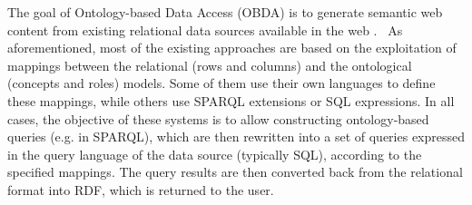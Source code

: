 The goal of Ontology-based Data Access (OBDA) is to generate semantic web content from existing relational data sources available in the web \cite{Sahoo_09}.\
%
As aforementioned, most of the existing approaches are based on the exploitation of mappings between the relational
(rows and columns) and the ontological (concepts and roles) models. Some of them use their own languages to define
these mappings, while others use SPARQL extensions or SQL expressions.
In all cases, the objective of these systems is to allow constructing ontology-based queries (e.g. in SPARQL), which
are then rewritten into a set of queries expressed in the query language of the data source (typically SQL), according
to the specified mappings. The query results are then converted back from the relational format into RDF, which is
returned to the user.

